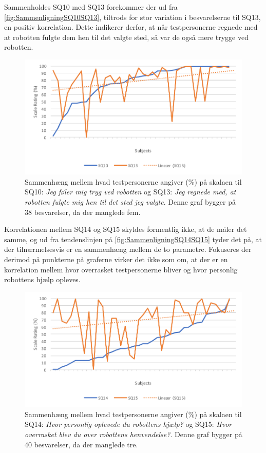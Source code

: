 \noindent
%
Sammenholdes SQ10 med SQ13 forekommer der ud fra \autoref{fig:SammenligningSQ10SQ13}, tiltrods for stor variation i besvarelserne til SQ13, en positiv korrelation. Dette indikerer derfor, at når testpersonerne regnede med at robotten fulgte dem hen til det valgte sted, så var de også mere trygge ved robotten. 
%
\begin{figure}[H]
	\centering
	\includegraphics[width=\textwidth]{Figure/Korrelationsgrafer/SQ10+SQ13}
	\caption{Sammenhæng mellem hvad testpersonerne angiver (\%) på skalaen til SQ10: \textit{Jeg føler mig tryg ved robotten} og SQ13: \textit{Jeg regnede med, at robotten fulgte mig hen til det sted jeg valgte}. Denne graf bygger på 38 besvarelser, da der manglede fem.}
	\label{fig:SammenligningSQ10SQ13}
\end{figure}
\noindent
%
Korrelationen mellem SQ14 og SQ15 skyldes formentlig ikke, at de måler det samme, og ud fra tendenslinjen på \autoref{fig:SammenligningSQ14SQ15} tyder det på, at der tilnærmelsesvis er en sammenhæng mellem de to parametre. Fokuseres der derimod på punkterne på graferne virker det ikke som om, at der er en korrelation mellem hvor overrasket testpersonerne bliver og hvor personlig robottens hjælp opleves.
%
\begin{figure}[H]
	\centering
	\includegraphics[width=\textwidth]{Figure/Korrelationsgrafer/SQ14+SQ15}
	\caption{Sammenhæng mellem hvad testpersonerne angiver (\%) på skalaen til SQ14: \textit{Hvor personlig oplevede du robottens hjælp?} og SQ15: \textit{Hvor overrasket blev du over robottens henvendelse?}. Denne graf bygger på 40 besvarelser, da der manglede tre.}
	\label{fig:SammenligningSQ14SQ15}
\end{figure}
